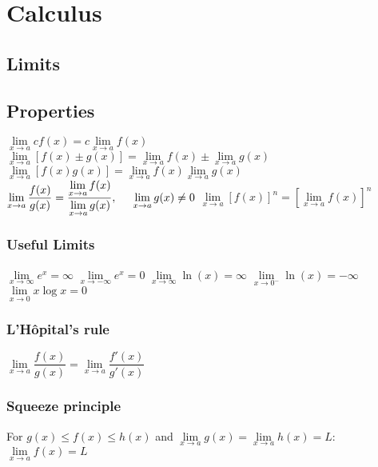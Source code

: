 	\section{Calculus}



		\subsection{Limits}

		\subsection{Properties}
\begin{itemize}
\itemt \( \lim\limits_{x\to a} cf(x) = c\lim\limits_{x\to a} f(x) \)
\itemt \( \lim\limits_{x\to a} [f(x) \pm g(x)] = \lim\limits_{x\to a} f(x) \pm \lim\limits_{x\to a} g(x) \)
\itemt \( \lim\limits_{x\to a} [f(x) g(x)] = \lim\limits_{x\to a} f(x)  \lim\limits_{x\to a} g(x) \)
\itemt \( \lim\limits_{x\to a} \dfrac{f(x)}{g(x)} = \dfrac{\lim\limits_{x\to a} f(x)}{\lim\limits_{x\to a} g(x)}, \tab[0.5cm] \lim\limits_{x\to a} g(x) \neq 0 \)
\itemt \( \lim\limits_{x\to a} [f(x)]^n = [\lim\limits_{x\to a} f(x)]^n \)
\end{itemize}

\subsubsection{Useful Limits}
\begin{itemize}
\itemt \( \lim\limits_{x\to \infty} e^x = \infty \)
\itemt \( \lim\limits_{x\to -\infty} e^x = 0 \)
\itemt \( \lim\limits_{x\to \infty} \ln(x) = \infty \)
\itemt \( \lim\limits_{x\to 0^-} \ln(x) = -\infty \)
\itemt \( \lim\limits_{x\to 0} x\log x = 0 \)
\end{itemize}

\subsubsection{L'H\^opital's rule}
\begin{itemize}
\itemt \( \lim\limits_{x\to a} \dfrac{f(x)}{g(x)} = \lim\limits_{x\to a} \dfrac{f'(x)}{g'(x)}  \)
\end{itemize}

\subsubsection{Squeeze principle}
\begin{itemize}
\itemt For \( g(x) \leq f(x) \leq h(x) \) and \( \lim\limits_{x\to a} g(x) = \lim\limits_{x\to a} h(x) = L\):
\subitem\tab \( \lim\limits_{x\to a} f(x) = L \)
\end{itemize}

